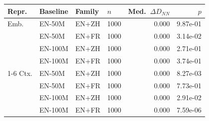 \begin{tabular}{@{}llllrr@{}}
\toprule
Repr. & Baseline & Family & $n$ & Med.\ $\Delta D_{NN}$ & $p$ \\
\midrule
Emb. & EN-50M & EN+ZH & 1000 & 0.000 & 9.87e-01 \\
 & EN-50M & EN+FR & 1000 & 0.000 & 3.14e-02 \\
 & EN-100M & EN+ZH & 1000 & 0.000 & 2.71e-01 \\
 & EN-100M & EN+FR & 1000 & 0.000 & 3.74e-01 \\
\cmidrule(lr){1-6}
Ctx. & EN-50M & EN+ZH & 1000 & 0.000 & 8.27e-03 \\
 & EN-50M & EN+FR & 1000 & 0.000 & 7.73e-01 \\
 & EN-100M & EN+ZH & 1000 & 0.000 & 2.91e-02 \\
 & EN-100M & EN+FR & 1000 & 0.000 & 7.59e-06 \\
\bottomrule
\end{tabular}
